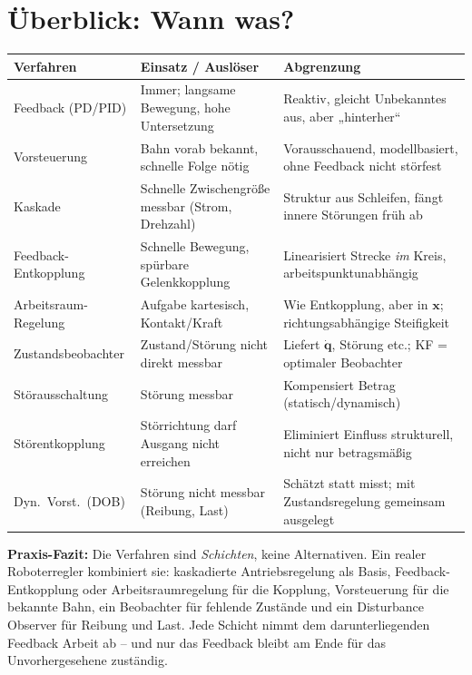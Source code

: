 \section{Überblick: Wann was?}
\begin{longtable}{@{}p{3.4cm}p{5.3cm}p{5.6cm}@{}}
\toprule
\textbf{Verfahren} & \textbf{Einsatz / Auslöser} & \textbf{Abgrenzung} \\
\midrule
Feedback (PD/PID) & Immer; langsame Bewegung, hohe Untersetzung &
  Reaktiv, gleicht Unbekanntes aus, aber „hinterher`` \\
Vorsteuerung & Bahn vorab bekannt, schnelle Folge nötig &
  Vorausschauend, modellbasiert, ohne Feedback nicht störfest \\
Kaskade & Schnelle Zwischengröße messbar (Strom, Drehzahl) &
  Struktur aus Schleifen, fängt innere Störungen früh ab \\
Feedback-Entkopplung & Schnelle Bewegung, spürbare Gelenk\-kopplung &
  Linearisiert Strecke \emph{im} Kreis, arbeitspunktunabhängig \\
Arbeitsraum-Regelung & Aufgabe kartesisch, Kontakt/Kraft &
  Wie Entkopplung, aber in $\bm{x}$; richtungsabhängige Steifigkeit \\
Zustandsbeobachter & Zustand/Störung nicht direkt messbar &
  Liefert $\dot{\bm{q}}$, Störung etc.; KF = optimaler Beobachter \\
Störausschaltung & Störung messbar &
  Kompensiert Betrag (statisch/dynamisch) \\
Störentkopplung & Störrichtung darf Ausgang nicht erreichen &
  Eliminiert Einfluss strukturell, nicht nur betragsmäßig \\
Dyn.\ Vorst.\ (DOB) & Störung nicht messbar (Reibung, Last) &
  Schätzt statt misst; mit Zustandsregelung gemeinsam ausgelegt \\
\bottomrule
\end{longtable}

\noindent\textbf{Praxis-Fazit:} Die Verfahren sind \emph{Schichten}, keine
Alternativen. Ein realer Roboterregler kombiniert sie: kaskadierte
Antriebsregelung als Basis, Feedback-Entkopplung oder Arbeitsraumregelung für
die Kopplung, Vorsteuerung für die bekannte Bahn, ein Beobachter für fehlende
Zustände und ein Disturbance Observer für Reibung und Last. Jede Schicht nimmt
dem darunterliegenden Feedback Arbeit ab -- und nur das Feedback bleibt am Ende
für das Unvorhergesehene zuständig.
